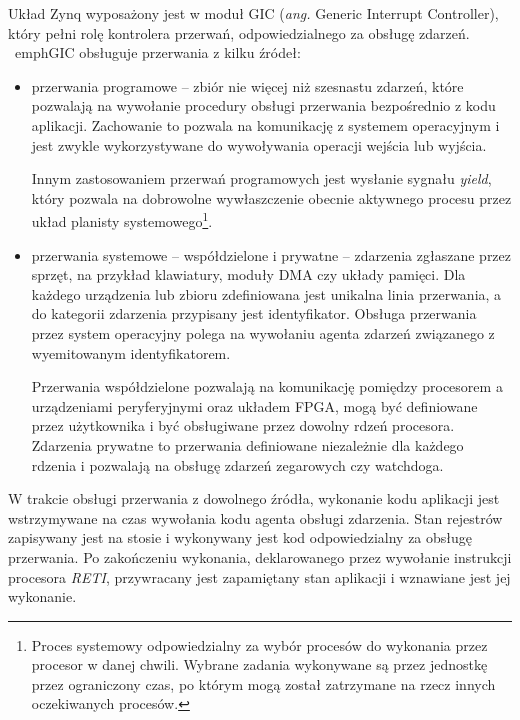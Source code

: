 Układ Zynq wyposażony jest w moduł GIC (\emph{ang.} Generic Interrupt Controller), który pełni rolę kontrolera przerwań, odpowiedzialnego za obsługę zdarzeń. \
emph{GIC} obsługuje przerwania z kilku źródeł:
\begin{itemize}
	\item przerwania programowe -- zbiór nie więcej niż szesnastu zdarzeń, które pozwalają na wywołanie procedury obsługi przerwania bezpośrednio z kodu aplikacji. Zachowanie to pozwala na komunikację z systemem operacyjnym i jest zwykle wykorzystywane do wywoływania operacji wejścia lub wyjścia. 
	
	Innym zastosowaniem przerwań programowych jest wysłanie sygnału \emph{yield}, który pozwala na dobrowolne wywłaszczenie obecnie aktywnego procesu przez układ planisty systemowego\footnote{Proces systemowy odpowiedzialny za wybór procesów do wykonania przez procesor w danej chwili. Wybrane zadania wykonywane są przez jednostkę przez ograniczony czas, po którym mogą został zatrzymane na rzecz innych oczekiwanych procesów.}. %
	
	\item przerwania systemowe -- współdzielone i prywatne -- zdarzenia zgłaszane przez sprzęt, na przykład klawiatury, moduły DMA czy układy pamięci. %
	Dla każdego urządzenia lub zbioru zdefiniowana jest unikalna linia przerwania, a do kategorii zdarzenia przypisany jest identyfikator. 
	Obsługa przerwania przez system operacyjny polega na wywołaniu agenta zdarzeń związanego z wyemitowanym identyfikatorem. %
	
	Przerwania współdzielone pozwalają na komunikację pomiędzy procesorem a urządzeniami peryferyjnymi oraz układem FPGA, mogą być definiowane przez użytkownika i być obsługiwane przez dowolny rdzeń procesora. 
	Zdarzenia prywatne to przerwania definiowane niezależnie dla każdego rdzenia i pozwalają na obsługę zdarzeń zegarowych czy watchdoga.
\end{itemize}

W trakcie obsługi przerwania z dowolnego źródła, wykonanie kodu aplikacji jest wstrzymywane na czas wywołania kodu agenta obsługi zdarzenia. 
Stan rejestrów zapisywany jest na stosie i wykonywany jest kod odpowiedzialny za obsługę przerwania. 
Po zakończeniu wykonania, deklarowanego przez wywołanie instrukcji procesora \emph{RETI}, przywracany jest zapamiętany stan aplikacji i wznawiane jest jej wykonanie.

